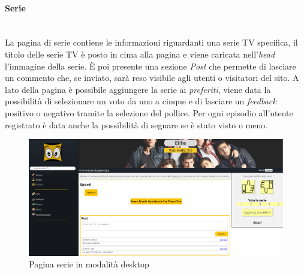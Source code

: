 \paragraph{Serie}
~\\
La pagina di serie contiene le informazioni riguardanti una serie TV specifica, il titolo delle serie TV è posto in cima alla pagina e viene caricata nell'\textit{head} l'immagine della serie. È poi presente una sezione \textit{Post} che permette di lasciare un commento che, se inviato, sarà reso visibile agli utenti o visitatori del sito. A lato della pagina è possibile aggiungere la serie ai \textit{preferiti}, viene data la possibilità di selezionare un voto da uno a cinque e di lasciare un \textit{feedback} positivo o negativo tramite la selezione del pollice. Per ogni episodio all'utente registrato è data anche la possibilità  di segnare se è stato visto o meno. 

\begin{figure}[H]
	\centerline{\includegraphics[scale= 0.33]{img/serie.png}}
	\caption{Pagina serie in modalità desktop}
	
\end{figure}

